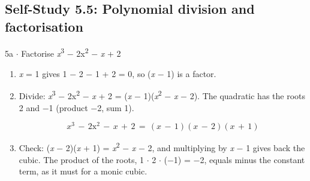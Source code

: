 \documentclass[11pt]{article}
\begin{document}
\begin{keepsection}\subsection{Self-Study 5.5: Polynomial division and factorisation}

\begin{workedbox}{5a \ensuremath{\cdot} Factorise \textit{x}\textsuperscript{3} \ensuremath{-} 2x\textsuperscript{2} \ensuremath{-} \textit{x} + 2}
\begin{enumerate}
\item \textit{x} = 1 gives 1 \ensuremath{-} 2 \ensuremath{-} 1 + 2 = 0, so (\textit{x} \ensuremath{-} 1) is a factor.
\item {}
Divide: \textit{x}\textsuperscript{3} \ensuremath{-} 2x\textsuperscript{2} \ensuremath{-} \textit{x} + 2 = (\textit{x} \ensuremath{-} 1)(\textit{x}\textsuperscript{2} \ensuremath{-} \textit{x} \ensuremath{-} 2). The quadratic has the roots 2 and \ensuremath{-}1 (product \ensuremath{-}2, sum 1).

\begin{equation*}{x}^{3}\, -\, 2\mathrm{x}^{2}\, -\, {x}\, +\, 2\, =\, ({x}\, -\, 1)({x}\, -\, 2)({x}\, +\, 1)\end{equation*}
\item Check: (\textit{x} \ensuremath{-} 2)(\textit{x} + 1) = \textit{x}\textsuperscript{2} \ensuremath{-} \textit{x} \ensuremath{-} 2, and multiplying by \textit{x} \ensuremath{-} 1 gives back the cubic. The product of the roots, 1 \ensuremath{\cdot} 2 \ensuremath{\cdot} (\ensuremath{-}1) = \ensuremath{-}2, equals minus the constant term, as it must for a monic cubic.
\end{enumerate}
\end{workedbox}

\end{keepsection}
\end{document}

